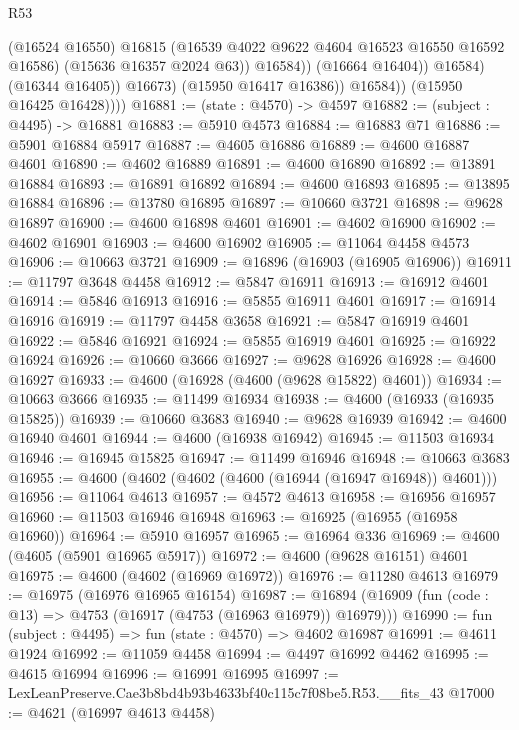 \begin{lexlean}{R53}
\begin{coremodule}
                              (@16524 @16550)
                              @16815
                              (@16539 @4022 @9622 @4604 @16523 @16550 @16592 @16586)
                              (@15636 @16357 @2024 @63))
                            @16584))
                        (@16664 @16404))
                      @16584)
                    (@16344 @16405))
                  @16673)
                (@15950 @16417 @16386))
              @16584))
          (@15950 @16425 @16428))))
@16881 := (state : @4570) -> @4597
@16882 := (subject : @4495) -> @16881
@16883 := @5910 @4573
@16884 := @16883 @71
@16886 := @5901 @16884 @5917
@16887 := @4605 @16886
@16889 := @4600 @16887 @4601
@16890 := @4602 @16889
@16891 := @4600 @16890
@16892 := @13891 @16884
@16893 := @16891 @16892
@16894 := @4600 @16893
@16895 := @13895 @16884
@16896 := @13780 @16895
@16897 := @10660 @3721
@16898 := @9628 @16897
@16900 := @4600 @16898 @4601
@16901 := @4602 @16900
@16902 := @4602 @16901
@16903 := @4600 @16902
@16905 := @11064 @4458 @4573
@16906 := @10663 @3721
@16909 := @16896 (@16903 (@16905 @16906))
@16911 := @11797 @3648 @4458
@16912 := @5847 @16911
@16913 := @16912 @4601
@16914 := @5846 @16913
@16916 := @5855 @16911 @4601
@16917 := @16914 @16916
@16919 := @11797 @4458 @3658
@16921 := @5847 @16919 @4601
@16922 := @5846 @16921
@16924 := @5855 @16919 @4601
@16925 := @16922 @16924
@16926 := @10660 @3666
@16927 := @9628 @16926
@16928 := @4600 @16927
@16933 := @4600 (@16928 (@4600 (@9628 @15822) @4601))
@16934 := @10663 @3666
@16935 := @11499 @16934
@16938 := @4600 (@16933 (@16935 @15825))
@16939 := @10660 @3683
@16940 := @9628 @16939
@16942 := @4600 @16940 @4601
@16944 := @4600 (@16938 @16942)
@16945 := @11503 @16934
@16946 := @16945 @15825
@16947 := @11499 @16946
@16948 := @10663 @3683
@16955 := @4600 (@4602 (@4602 (@4600 (@16944 (@16947 @16948)) @4601)))
@16956 := @11064 @4613
@16957 := @4572 @4613
@16958 := @16956 @16957
@16960 := @11503 @16946 @16948
@16963 := @16925 (@16955 (@16958 @16960))
@16964 := @5910 @16957
@16965 := @16964 @336
@16969 := @4600 (@4605 (@5901 @16965 @5917))
@16972 := @4600 (@9628 @16151) @4601
@16975 := @4600 (@4602 (@16969 @16972))
@16976 := @11280 @4613
@16979 := @16975 (@16976 @16965 @16154)
@16987 := @16894 (@16909 (fun (code : @13) => @4753 (@16917 (@4753 (@16963 @16979)) @16979)))
@16990 := fun (subject : @4495) => fun (state : @4570) => @4602 @16987
@16991 := @4611 @1924
@16992 := @11059 @4458
@16994 := @4497 @16992 @4462
@16995 := @4615 @16994
@16996 := @16991 @16995
@16997 := LexLeanPreserve.Cae3b8bd4b93b4633bf40c115c7f08be5.R53.__fits_43
@17000 := @4621 (@16997 @4613 @4458)

\end{coremodule}
\end{lexlean}
